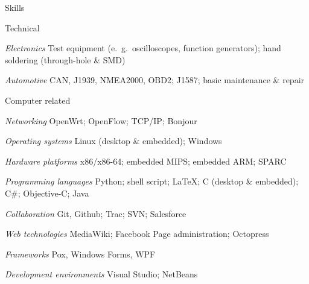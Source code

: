\documentclass[letterpaper,12pt,oneside,compact]{article}
\begin{document}
\begin{heading}{Skills}
\begin{resitem}{Technical}
\item \emph{Electronics}\hspace*{10pt} Test equipment (e.\ g.\ oscilloscopes, function generators); hand soldering (through-hole \& SMD)
\item \emph{Automotive}\hspace*{10pt} CAN, J1939, NMEA2000, OBD2; J1587; basic maintenance \& repair
\end{resitem}
\begin{resitem}{Computer related}
\item \emph{Networking}\hspace*{10pt} OpenWrt; OpenFlow; TCP/IP; Bonjour
\item \emph{Operating systems}\hspace*{10pt} Linux (desktop \& embedded); Windows
\item \emph{Hardware platforms}\hspace*{10pt} x86/x86-64; embedded MIPS; embedded ARM; SPARC
\item \emph{Programming languages}\hspace*{10pt} Python; shell script; \LaTeX{}; C (desktop \& embedded); C\#; Objective-C; Java
\item \emph{Collaboration}\hspace*{10pt} Git, Github; Trac; SVN; Salesforce
\item \emph{Web technologies}\hspace*{10pt} MediaWiki; Facebook Page administration; Octopress
\item \emph{Frameworks}\hspace*{10pt} Pox, Windows Forms, WPF
\item \emph{Development environments}\hspace*{10pt} Visual Studio; NetBeans
\end{resitem}
\end{heading}

\end{document}
